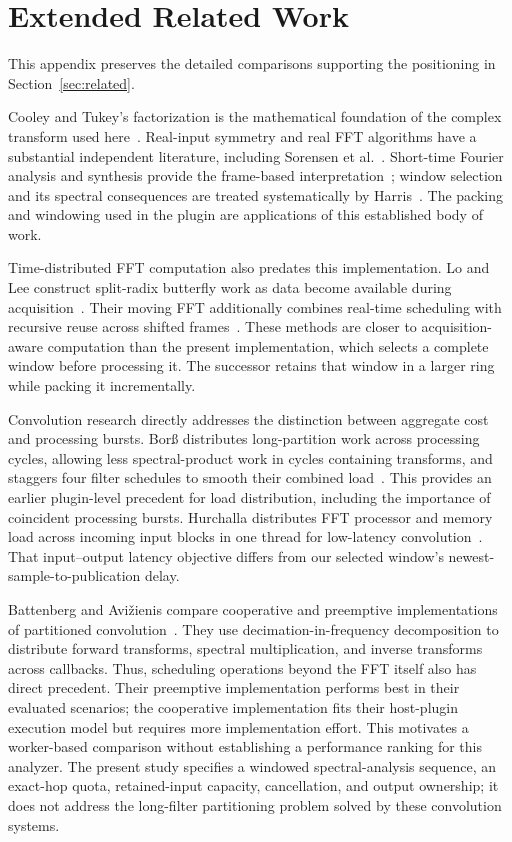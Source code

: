 \section{Extended Related Work}
\label{app:related-work}
This appendix preserves the detailed comparisons supporting the positioning
in Section~\ref{sec:related}.

Cooley and Tukey's factorization is the mathematical foundation of the complex
transform used here~\cite{cooley1965}. Real-input symmetry and real FFT
algorithms have a substantial independent literature, including Sorensen
et al.~\cite{sorensen1987}. Short-time Fourier analysis and synthesis provide
the frame-based interpretation~\cite{allen1977}; window selection and its
spectral consequences are treated systematically by Harris~\cite{harris1978}.
The packing and windowing used in the plugin are applications of this established
body of work.

Time-distributed FFT computation also predates this implementation. Lo and Lee
construct split-radix butterfly work as data become available during
acquisition~\cite{lo1998,lo1999}. Their moving FFT additionally combines
real-time scheduling with recursive reuse across shifted
frames~\cite{lomoving1999}. These methods are closer to acquisition-aware
computation than the present implementation, which selects a complete
window before processing it. The successor retains that window in a larger
ring while packing it incrementally.

Convolution research directly addresses the distinction between aggregate
cost and processing bursts. Bor\ss{} distributes long-partition work across
processing cycles, allowing less spectral-product work in cycles containing
transforms, and staggers four filter schedules to smooth their combined
load~\cite{borss2009}. This provides an earlier plugin-level precedent for
load distribution, including the importance of coincident processing bursts.
Hurchalla distributes FFT processor and memory load across incoming input
blocks in one thread for low-latency convolution~\cite{hurchalla2010}.
That input--output latency objective differs from our selected window's
newest-sample-to-publication delay.

Battenberg and Avi\v{z}ienis compare cooperative and preemptive implementations
of partitioned convolution~\cite{battenberg2011}. They use
decimation-in-frequency decomposition to distribute forward transforms,
spectral multiplication, and inverse transforms across callbacks. Thus,
scheduling operations beyond the FFT itself also has direct precedent.
Their preemptive implementation performs best in their evaluated scenarios;
the cooperative implementation fits their host-plugin execution model but
requires more implementation effort. This motivates a worker-based comparison
without establishing a performance ranking for this analyzer.
The present study specifies a windowed spectral-analysis sequence, an exact-hop
quota, retained-input capacity, cancellation, and output ownership; it does
not address the long-filter partitioning problem solved by these convolution
systems.

